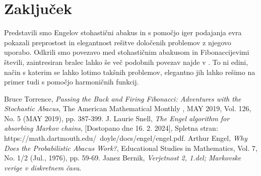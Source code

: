 \documentclass[twoside,11pt]{article}
\begin{document}
\section{Zaključek}
Predstavili smo Engelov stohastični abakus in s pomočjo iger podajanja evra pokazali preprostost in elegantnost rešitve določenih problemov z njegovo uporabo. 
Odkrili smo povezavo med stohastičnim abakusom in Fibonaccijevimi števili, zaintresiran bralec lahko še več podobnih povezav najde v \cite{torr}. To ni edini, način s katerim se lahko lotimo takšnih problemov, elegantno jih lahko rešimo na primer tudi s pomočjo harmoničnih funkcij.


\begin{thebibliography}{99}

 Bruce Torrence, \emph{  Passing the Buck and Firing Fibonacci: Adventures with the Stochastic Abacus}, The American Mathematical Monthly , MAY 2019, Vol. 126, No. 5 (MAY 2019), pp. 387-399.
 J. Laurie Snell, \emph{The Engel algorithm for absorbing Markov chains}, [Dostopano dne 16. 2. 2024], Spletna stran: https://math.dartmouth.edu/~doyle/docs/engel/engel.pdf. 
 Arthur Engel, \emph{Why Does the Probabilistic Abacus Work?},  Educational Studies in Mathematics, Vol. 7, No. 1/2 (Jul., 1976), pp. 59-69. 
 Janez Bernik, \emph{Verjetnost 2, 1.del; Markovske verige v diskretnem času}.

\end{thebibliography}
\end{document}
